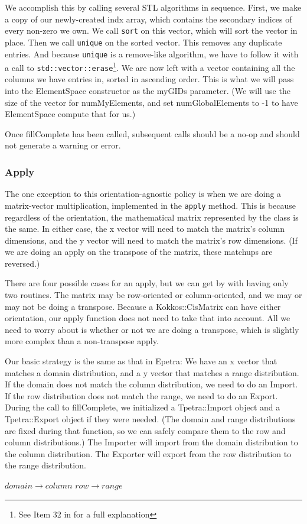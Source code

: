 \documentclass[10pt,relax]{TpetraDesign}
\begin{document}
We accomplish this by calling several STL algorithms in sequence. First, we make a copy of our newly-created indx array, which contains the secondary indices of every non-zero we own. We call \texttt{sort} on this vector, which will sort the vector in place. Then we call \texttt{unique} on the sorted vector. This removes any duplicate entries. And because \texttt{unique} is a remove-like algorithm, we have to follow it with a call to \texttt{std::vector::erase}\footnote{See Item 32 in \cite{Effective-STL} for a full explanation}. We are now left with a vector containing all the columns we have entries in, sorted in ascending order. This is what we will pass into the ElementSpace constructor as the myGIDs parameter. (We will use the size of the vector for numMyElements, and set numGlobalElements to -1 to have ElementSpace compute that for us.)

Once fillComplete has been called, subsequent calls should be a no-op and should not generate a warning or error.

\subsubsection*{Apply}
The one exception to this orientation-agnostic policy is when we are doing a matrix-vector multiplication, implemented in the \texttt{apply} method. This is because regardless of the orientation, the mathematical matrix represented by the class is the same. In either case, the x vector will need to match the matrix's column dimensions, and the y vector will need to match the matrix's row dimensions. (If we are doing an apply on the transpose of the matrix, these matchups are reversed.)

There are four possible cases for an apply, but we can get by with having only two routines. The matrix may be row-oriented or column-oriented, and we may or may not be doing a transpose. Because a Kokkos::CisMatrix can have either orientation, our apply function does not need to take that into account. All we need to worry about is whether or not we are doing a transpose, which is slightly more complex than a non-transpose apply.

Our basic strategy is the same as that in Epetra: We have an x vector that matches a domain distribution, and a y vector that matches a range distribution. If the domain does not match the column distribution, we need to do an Import. If the row distribution does not match the range, we need to do an Export. During the call to fillComplete, we initialized a Tpetra::Import object and a Tpetra::Export object if they were needed. (The domain and range distributions are fixed during that function, so we can safely compare them to the row and column distributions.) The Importer will import from the domain distribution to the column distribution. The Exporter will export from the row distribution to the range distribution.
\begin{center}
$domain \rightarrow column$
\hspace{1cm}
$row    \rightarrow range$
\end{center}
\end{document}
